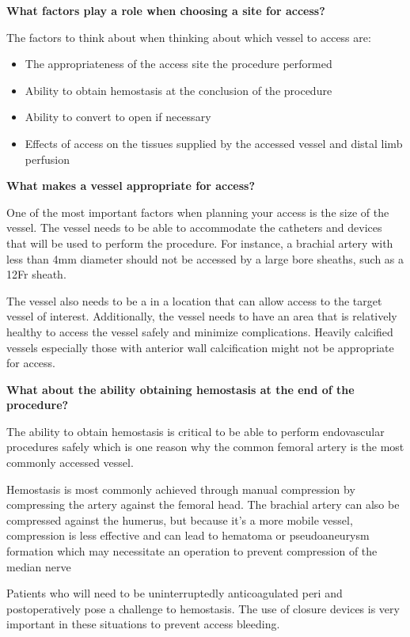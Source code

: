 \documentclass[
]{book}
\begin{document}
\textbf{What factors play a role when choosing a site for access?}

The factors to think about when thinking about which vessel to access
are:

\begin{itemize}
\item
  The appropriateness of the access site the procedure performed
\item
  Ability to obtain hemostasis at the conclusion of the procedure
\item
  Ability to convert to open if necessary
\item
  Effects of access on the tissues supplied by the accessed vessel and
  distal limb perfusion
\end{itemize}

\textbf{What makes a vessel appropriate for access?}

One of the most important factors when planning your access is the size
of the vessel. The vessel needs to be able to accommodate the catheters
and devices that will be used to perform the procedure. For instance, a
brachial artery with less than 4mm diameter should not be accessed by a
large bore sheaths, such as a 12Fr sheath.

The vessel also needs to be a in a location that can allow access to the
target vessel of interest. Additionally, the vessel needs to have an
area that is relatively healthy to access the vessel safely and minimize
complications. Heavily calcified vessels especially those with anterior
wall calcification might not be appropriate for access.

\textbf{What about the ability obtaining hemostasis at the end of the
procedure?}

The ability to obtain hemostasis is critical to be able to perform
endovascular procedures safely which is one reason why the common
femoral artery is the most commonly accessed vessel.

Hemostasis is most commonly achieved through manual compression by
compressing the artery against the femoral head. The brachial artery can
also be compressed against the humerus, but because it's a more mobile
vessel, compression is less effective and can lead to hematoma or
pseudoaneurysm formation which may necessitate an operation to prevent
compression of the median nerve

Patients who will need to be uninterruptedly anticoagulated peri and
postoperatively pose a challenge to hemostasis. The use of closure
devices is very important in these situations to prevent access
bleeding.
\end{document}
